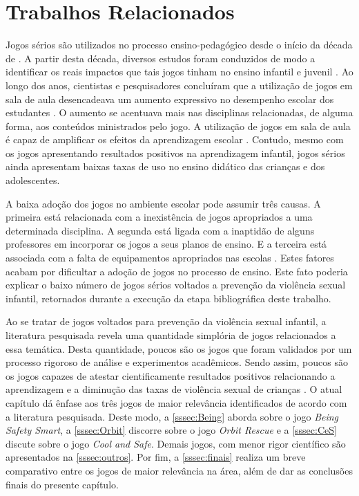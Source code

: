 



\chapter{Trabalhos Relacionados}\label{ssec:TR}

Jogos sérios são utilizados no processo ensino-pedagógico desde o início da década de \citeyear{clark1970serious}. A partir desta década, diversos estudos foram conduzidos de modo a identificar os reais impactos que tais jogos tinham no ensino infantil e juvenil \cite{stieler2016paper}. Ao longo dos anos, cientistas e pesquisadores concluíram que a utilização de jogos em sala de aula desencadeava um aumento expressivo no desempenho escolar dos estudantes \cite{wentzel1998social}. O aumento se acentuava mais nas disciplinas relacionadas, de alguma forma, aos conteúdos ministrados pelo jogo. A utilização de jogos em sala de aula é capaz de amplificar os efeitos da aprendizagem escolar \cite{jones2020serious}. Contudo, mesmo com os jogos apresentando resultados positivos na aprendizagem infantil, jogos sérios ainda apresentam baixas taxas de uso no ensino didático das crianças e dos adolescentes. 

A baixa adoção dos jogos no ambiente escolar pode assumir três causas. A primeira está relacionada com a inexistência de jogos apropriados a uma determinada disciplina. A segunda está ligada com a inaptidão de alguns professores em incorporar os jogos a seus planos de ensino. E a terceira está associada com a falta de equipamentos apropriados nas escolas \cite{dip2016advancing}. Estes fatores acabam por dificultar a adoção de jogos no processo de ensino. Este fato poderia explicar o baixo número de jogos sérios voltados a prevenção da violência sexual infantil, retornados durante a execução da etapa bibliográfica deste trabalho. 

Ao se tratar de jogos voltados para prevenção da violência sexual infantil, a literatura pesquisada revela uma quantidade simplória de jogos relacionados a essa temática. Desta quantidade, poucos são os jogos que foram validados por um processo rigoroso de análise e experimentos acadêmicos. Sendo assim, poucos são os jogos capazes de atestar cientificamente resultados positivos relacionando a aprendizagem e a diminução das taxas de violência sexual de crianças \cite{jones2010being}. O atual capítulo dá ênfase aos três jogos de maior relevância identificados de acordo com a literatura pesquisada. Deste modo, a \autoref{sssec:Being} aborda sobre o jogo \textit{Being Safety Smart}, a \autoref{sssec:Orbit} discorre sobre o jogo \textit{Orbit Rescue} e a \autoref{sssec:CeS} discute sobre o jogo \textit{Cool and Safe}. Demais jogos, com menor rigor científico são apresentados na \autoref{sssec:outros}. Por fim, a \autoref{sssec:finais} realiza um breve comparativo entre os jogos de maior relevância na área, além de dar as conclusões finais do presente capítulo.  

